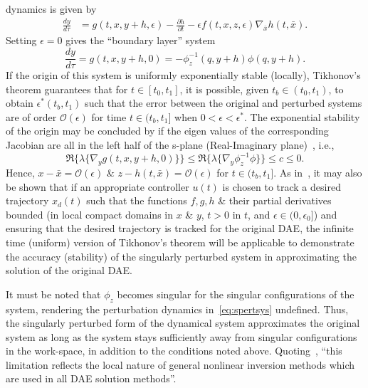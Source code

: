 \documentclass[10pt,final,journal,letterpaper,oneside,twocolumn]{IEEEtran}
\begin{document}
dynamics is given by
\begin{align}
  \frac{dy}{d\tau} &= g(t, x, y+h, \epsilon) - \frac{\partial
    h}{\partial t} - \epsilon f(t, x, z, \epsilon) \nabla_{\bar{x}}
                     h(t, \bar{x}).
  \label{eq:bdyn}                     
\end{align}
Setting $\epsilon=0$ gives the ``boundary layer'' system
\begin{equation}
  \label{eq:blsys}
  \frac{dy}{d\tau} = g(t, x, y+h, 0) = -\phi_z^{-1}(q, y+h)\phi(q, y+h).
\end{equation}
If the origin of this system is uniformly exponentially stable
(locally), Tikhonov's theorem guarantees that for $t \in [t_0, t_1]$,
it is possible, given $t_b\in (t_0, t_1)$, to obtain $\epsilon^*(t_b,
t_1)$ such that the error between the original and perturbed systems
are of order $\mathcal{O}(\epsilon)$ for time $t\in
(t_b, t_1]$ when $0< \epsilon< \epsilon^*$. The exponential stability
of the origin may be concluded by if the eigen values of the
corresponding Jacobian are all in the left half of the s-plane
(Real-Imaginary plane)~\cite{gordon_singular_1998}, i.e.,
\begin{equation}
  \Re\{\lambda\{\nabla_y g(t, x, y+h, 0)\}\} \leq
  \Re\{\lambda\{\nabla_y \phi_z^{-1}\phi \}\} \leq c \leq 0.
  \label{eq:expstabor}
\end{equation}
Hence, $x-\bar{x} = \mathcal{O}(\epsilon)$ \& $z-h(t, \bar{x}) =
\mathcal{O}(\epsilon)$ for $t\in (t_b, t_1]$. As
in~\cite{wang_domain_2004}, it may also be shown that if an
appropriate controller $u(t)$ is chosen to track a desired trajectory
$x_d(t)$ such that the functions $f, g, h$ \& their partial
derivatives bounded (in local compact domains in $x$ \& $y$, $t>0$ in
$t$, and $\epsilon\in (0, \epsilon_0]$) and ensuring that the desired
trajectory is tracked for the original DAE, the infinite time
(uniform) version of Tikhonov's theorem will be applicable to
demonstrate the accuracy (stability) of the singularly perturbed
system in approximating the solution of the original DAE.

It must be noted that $\phi_z$ becomes singular for the singular
configurations of the system, rendering the perturbation dynamics
in~\cref{eq:spertsys} undefined. Thus, the singularly perturbed form
of the dynamical system approximates the original system as long as
the system stays sufficiently away from singular configurations in the
work-space, in addition to the conditions noted
above. Quoting~\cite{gordon_singular_1998}, ``this limitation reflects
the local nature of general nonlinear inversion methods which are used
in all DAE solution methods''.
\end{document}
